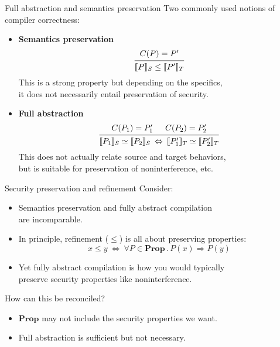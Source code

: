 \documentclass{beamer}
\begin{document}
\begin{frame}{Full abstraction and semantics preservation}
Two commonly used notions of compiler correctness:
\begin{itemize}
  \item \textbf{Semantics preservation}
  \[
    \begin{prooftree}
      \hypo{C(P) = P'}
      \infer1{\llbracket P \rrbracket_S \le \llbracket P' \rrbracket_T}
    \end{prooftree}
  \]
  This is a strong property but depending on the specifics, \\
  it does not necessarily entail preservation of security.
  \item \textbf{Full abstraction}
  \[
    \begin{prooftree}
      \hypo{C(P_1) = P_1'}
      \hypo{C(P_2) = P_2'}
      \infer2{
        \llbracket P_1 \rrbracket_S \simeq \llbracket P_2 \rrbracket_S
        \: \Leftrightarrow \:
        \llbracket P_1' \rrbracket_T \simeq \llbracket P_2' \rrbracket_T
      }
    \end{prooftree}
  \]
  This does not actually relate source and target behaviors, \\
  but is suitable for preservation of noninterference, etc.
\end{itemize}
\end{frame}

\begin{frame}{Security preservation and refinement}
Consider:
\begin{itemize}
  \item
    Semantics preservation and fully abstract compilation \\
    are incomparable.
  \item
    In principle,
    refinement ($\le$) is all about preserving properties:
    \[
      x \le y \: \Longleftrightarrow \:
      \forall P \in \mathbf{Prop} \mathbin. P(x) \Rightarrow P(y)
    \]
  \item Yet fully abstract compilation is how you would typically \\
    preserve security properties like noninterference.
\end{itemize}

\vfill
How can this be reconciled?
\begin{itemize}
  \item $\mathbf{Prop}$ may not include the security properties we want.
  \item Full abstraction is sufficient but not necessary.
\end{itemize}
\end{frame}
\end{document}
